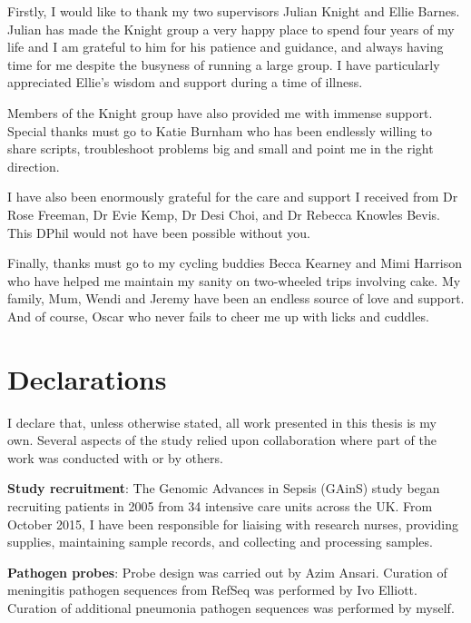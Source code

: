 Firstly, I would like to thank my two supervisors Julian Knight and Ellie Barnes. Julian has made the Knight group a very happy place to spend four years of my life and I am grateful to him for his patience and guidance, and always having time for me despite the busyness of running a large group. I have particularly appreciated Ellie's wisdom and support during a time of illness.

Members of the Knight group have also provided me with immense support. Special thanks must go to Katie Burnham who has been endlessly willing to share scripts, troubleshoot problems big and small and point me in the right direction. 

I have also been enormously grateful for the care and support I received from Dr Rose Freeman, Dr Evie Kemp, Dr Desi Choi, and Dr Rebecca Knowles Bevis. This DPhil would not have been possible without you. 

Finally, thanks must go to my cycling buddies Becca Kearney and Mimi Harrison who have helped me maintain my sanity on two-wheeled trips involving cake. My family, Mum, Wendi and Jeremy have been an endless source of love and support. And of course, Oscar who never fails to cheer me up with licks and cuddles.







\newpage
\chapter*{Declarations}
\thispagestyle{plain}
\noindent

I declare that, unless otherwise stated, all work presented in this thesis is my own. Several aspects of the study relied upon collaboration where part of the work was conducted with or by others.

\textbf{Study recruitment}: The Genomic Advances in Sepsis (GAinS) study began recruiting patients in 2005 from 34 intensive care units across the UK. From October 2015, I have been responsible for liaising with research nurses, providing supplies, maintaining sample records, and collecting and processing samples.

\textbf{Pathogen probes}: Probe design was carried out by Azim Ansari. Curation of meningitis pathogen sequences from RefSeq was performed by Ivo Elliott. Curation of additional pneumonia pathogen sequences was performed by myself. 

